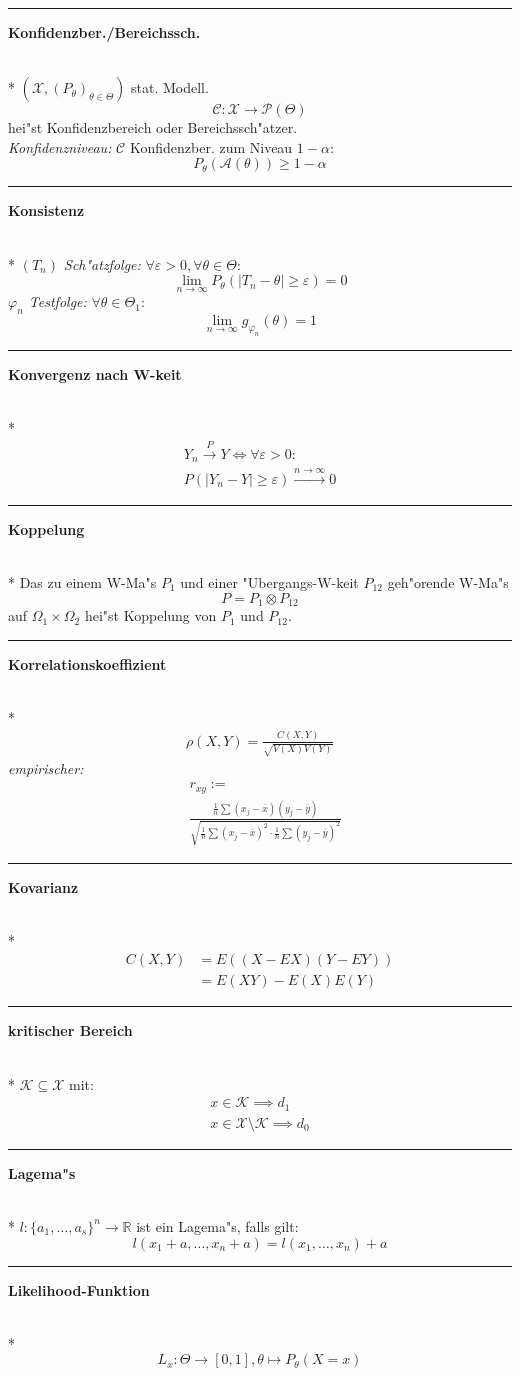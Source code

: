 \documentclass{article}
\newcommand{\hh}[1]{{\vspace{1pt}\hrule\vspace{1pt} \noindent\textbf{#1}}\\*}
\newcommand{\hhh}[1]{{\vspace{1pt}\noindent\emph{#1:}}}
\begin{document}
\begin{multicols}{4}
\hh{Konfidenzber./Bereichssch.}
$(\mathcal{X},(P_\theta)_{\theta\in\Theta})$ stat. Modell.
\[\mathcal{C}:\mathcal{X}\to\mathcal{P}(\Theta)\]
hei"st Konfidenzbereich oder Bereichssch"atzer.\\
\hhh{Konfidenzniveau}
$\mathcal{C}$ Konfidenzber. zum Niveau $1-\alpha$:
\[P_\theta(\mathcal{A}(\theta))\ge 1-\alpha\]

\hh{Konsistenz}
\hhh{$(T_n)$ Sch"atzfolge} 
$\forall\varepsilon>0,\forall\theta\in\Theta:$\[\lim_{n\to\infty} P_\theta(|T_n-\theta|\ge\varepsilon)=0\]
\hhh{$\varphi_n$ Testfolge}
$\forall\theta\in\Theta_1:$
\[\lim_{n\to\infty} g_{\varphi_n}(\theta)=1\]

\hh{Konvergenz nach W-keit}
\begin{align*}
Y_n\stackrel P\to Y \iff \forall\varepsilon>0: \\
P(|Y_n-Y|\ge\varepsilon)\stackrel{n\to\infty}\to 0
\end{align*}

\hh{Koppelung}
Das zu einem W-Ma"s $P_1$ und einer "Ubergangs-W-keit $P_{12}$ geh"orende W-Ma"s
\[P=P_1\otimes P_{12}\]
auf $\Omega_1\times\Omega_2$ hei"st Koppelung von $P_1$ und $P_{12}$.

\hh{Korrelationskoeffizient}
\begin{align*}
\rho(X,Y)=\frac{C(X,Y)}{\sqrt{V(X)V(Y)}}
\end{align*}
\hhh{empirischer}
\begin{align*}
&r_{xy}:=\\
&\frac{\frac1n\sum(x_j-\overline x)(y_j-\overline y)}{\sqrt{\frac1n\sum(x_j-\overline x)^2\cdot\frac1n\sum(y_j-\overline y)^2}}
\end{align*}

\hh{Kovarianz}
\begin{align*}
C(X,Y)&=E((X-EX)(Y-EY))\\
&=E(XY)-E(X)E(Y)
\end{align*}

\hh{kritischer Bereich}
$\mathcal{K}\subseteq\mathcal{X}$ mit:\\
\begin{align*}
x\in\mathcal{K}\implies d_1\\ 
x\in\mathcal{X}\setminus\mathcal{K}\implies d_0
\end{align*}

\hh{Lagema"s}
$l:\{a_1,\ldots,a_s\}^n\to\mathbb{R}$ ist ein Lagema"s, falls gilt:
\[l(x_1+a,\ldots,x_n+a)=l(x_1,\ldots,x_n)+a\]

\hh{Likelihood-Funktion}
\[L_x:\Theta\to[0,1],\theta\mapsto P_\theta(X=x)\]


\end{multicols}
\end{document}
